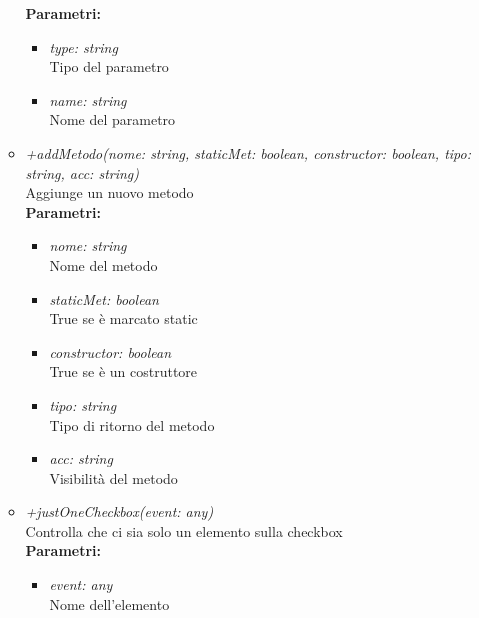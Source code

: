 \begin{itemize}
\begin{itemize}
    		\textbf{Parametri:}
    		\begin{itemize}
    			\item \emph{type: string}\\
    			Tipo del parametro
    			\item \emph{name: string}\\
    			Nome del parametro
    		\end{itemize}
    		\item \emph{+addMetodo(nome: string, staticMet: boolean, constructor: boolean, tipo: string, acc: string)}\\
    		Aggiunge un nuovo metodo\\
    		\textbf{Parametri:}
    		\begin{itemize}
    			\item \emph{nome: string}\\
    			Nome del metodo
    			\item \emph{staticMet: boolean}\\
    			True se è marcato static
    			\item \emph{constructor: boolean}\\
    			True se è un costruttore
    			\item \emph{tipo: string}\\
    			Tipo di ritorno del metodo
    			\item \emph{acc: string}\\
    			Visibilità del metodo
    		\end{itemize}
    		\item \emph{+justOneCheckbox(event: any)}\\
    		Controlla che ci sia solo un elemento sulla checkbox\\
    		\textbf{Parametri:}
    		\begin{itemize}
    			\item \emph{event: any}\\
    			Nome dell'elemento
    		\end{itemize}
		\end{itemize}
\end{itemize}
